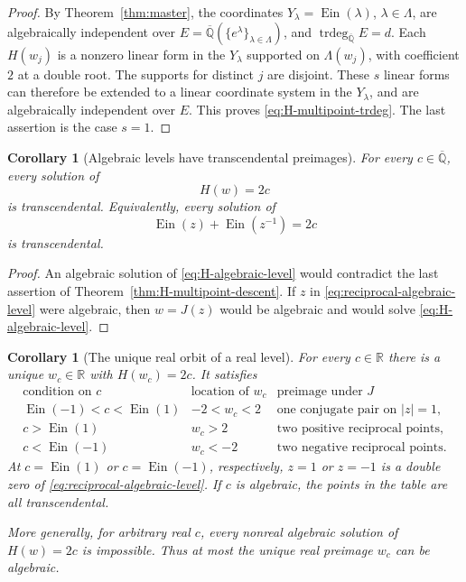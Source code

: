 \documentclass[11pt]{article}
\newtheorem{corollary}[theorem]{Corollary}
\theoremstyle{definition}
\theoremstyle{remark}
\newcommand{\Qbar}{\overline{\mathbb Q}}
\newcommand{\Ein}{\operatorname{Ein}}
\begin{document}
\begin{proof}
By Theorem~\ref{thm:master}, the coordinates
$Y_\lambda=\Ein(\lambda)$, $\lambda\in\Lambda$, are algebraically
independent over
$E=\Qbar(\{e^\lambda\}_{\lambda\in\Lambda})$, and
$\operatorname{trdeg}_{\Qbar}E=d$.  Each $H(w_j)$ is a nonzero linear form
in the $Y_\lambda$ supported on $\Lambda(w_j)$, with coefficient $2$ at a
double root.  The supports for distinct $j$ are disjoint.  These $s$ linear
forms can therefore be extended to a linear coordinate system in the
$Y_\lambda$, and are algebraically independent over $E$.  This proves
\eqref{eq:H-multipoint-trdeg}.  The last assertion is the case $s=1$.
\end{proof}

\begin{corollary}[Algebraic levels have transcendental preimages]
\label{cor:H-algebraic-levels}
For every $c\in\Qbar$, every solution of
\begin{equation}\label{eq:H-algebraic-level}
 H(w)=2c
\end{equation}
is transcendental.  Equivalently, every solution of
\begin{equation}\label{eq:reciprocal-algebraic-level}
 \Ein(z)+\Ein(z^{-1})=2c
\end{equation}
is transcendental.
\end{corollary}

\begin{proof}
An algebraic solution of \eqref{eq:H-algebraic-level} would contradict the
last assertion of Theorem~\ref{thm:H-multipoint-descent}.  If $z$ in
\eqref{eq:reciprocal-algebraic-level} were algebraic, then
$w=J(z)$ would be algebraic and would solve \eqref{eq:H-algebraic-level}.
\end{proof}

\begin{corollary}[The unique real orbit of a real level]
\label{cor:H-real-levels}
For every $c\in\mathbb R$ there is a unique $w_c\in\mathbb R$ with
$H(w_c)=2c$.  It satisfies
\[
 \begin{array}{c|c|c}
 \text{condition on }c&\text{location of }w_c&
 \text{preimage under }J\\ \hline
 \Ein(-1)<c<\Ein(1)&-2<w_c<2&
 \text{one conjugate pair on }|z|=1,\\
 c>\Ein(1)&w_c>2&\text{two positive reciprocal points},\\
 c<\Ein(-1)&w_c<-2&\text{two negative reciprocal points}.
 \end{array}
\]
At $c=\Ein(1)$ or $c=\Ein(-1)$, respectively, $z=1$ or $z=-1$ is a
double zero of \eqref{eq:reciprocal-algebraic-level}.  If $c$ is algebraic,
the points in the table are all transcendental.

More generally, for arbitrary real $c$, every nonreal algebraic solution
of $H(w)=2c$ is impossible.  Thus at most the unique real preimage $w_c$
can be algebraic.
\end{corollary}
\end{document}
